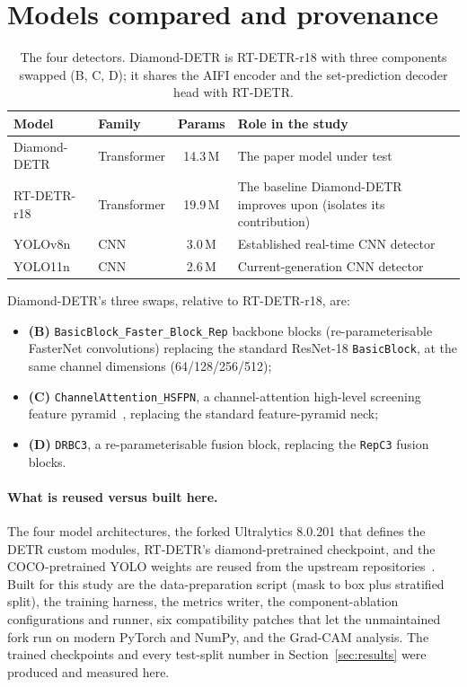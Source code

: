 \documentclass[11pt,a4paper]{article}
\begin{document}
\section{Models compared and provenance}
\begin{table}[H]
\centering
\caption{The four detectors. Diamond-DETR is RT-DETR-r18 with three components swapped (B, C, D);
it shares the AIFI encoder and the set-prediction decoder head with RT-DETR.}
\label{tab:models}
\small
\renewcommand{\arraystretch}{1.2}
\begin{tabularx}{\textwidth}{l l c X}
\toprule
\textbf{Model} & \textbf{Family} & \textbf{Params} & \textbf{Role in the study} \\
\midrule
Diamond-DETR & Transformer & 14.3\,M & The paper model under test \\
RT-DETR-r18  & Transformer & 19.9\,M & The baseline Diamond-DETR improves upon (isolates its contribution) \\
YOLOv8n      & CNN         & 3.0\,M  & Established real-time CNN detector \\
YOLO11n      & CNN         & 2.6\,M  & Current-generation CNN detector \\
\bottomrule
\end{tabularx}
\end{table}

Diamond-DETR's three swaps, relative to RT-DETR-r18, are:
\begin{itemize}[leftmargin=1.4em,itemsep=2pt,topsep=2pt]
  \item \textbf{(B)} \texttt{BasicBlock\_Faster\_Block\_Rep} backbone blocks (re-parameterisable
        FasterNet convolutions) replacing the standard ResNet-18 \texttt{BasicBlock}, at the same
        channel dimensions (64/128/256/512);
  \item \textbf{(C)} \texttt{ChannelAttention\_HSFPN}, a channel-attention high-level screening
        feature pyramid~\cite{hsfpn}, replacing the standard feature-pyramid neck;
  \item \textbf{(D)} \texttt{DRBC3}, a re-parameterisable fusion block, replacing the
        \texttt{RepC3} fusion blocks.
\end{itemize}

\paragraph{What is reused versus built here.}
The four model architectures, the forked Ultralytics 8.0.201 that defines the DETR custom modules,
RT-DETR's diamond-pretrained checkpoint, and the COCO-pretrained YOLO weights are reused from the
upstream repositories~\cite{diamond,ultralytics}. Built for this study are the data-preparation
script (mask to box plus stratified split), the training harness, the metrics writer, the
component-ablation configurations and runner, six compatibility patches that let the unmaintained
fork run on modern PyTorch and NumPy, and the Grad-CAM analysis. The trained checkpoints and every
test-split number in Section~\ref{sec:results} were produced and measured here.
\end{document}
